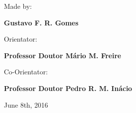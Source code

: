 \vspace{0.5cm}
\begin{center}
\begin{normalsize}
\begin{large}
Made by:
\end{large}
\end{normalsize}
\end{center}

\vspace{0.2cm}
\begin{center}
\begin{large}
\textbf{Gustavo F. R. Gomes}
\end{large}
\end{center}

\vspace{0,5cm}
\begin{center}
\begin{normalsize}
\begin{large}
Orientator:
\end{large}
\end{normalsize}
\end{center}

\vspace{0.2cm}
\begin{center}
\begin{large}
\textbf{Professor Doutor Mário M. Freire}
\end{large}
\end{center}

\vspace{0,5cm}
\begin{center}
\begin{normalsize}
\begin{large}
Co-Orientator:
\end{large}
\end{normalsize}
\end{center}

\vspace{0.2cm}
\begin{center}
\begin{large}
\textbf{Professor Doutor Pedro R. M. Inácio}
\end{large}
\end{center}

\vspace{0.5cm}
\begin{center}
\begin{normalsize}
	June 8th, 2016
\end{normalsize}
\end{center}
